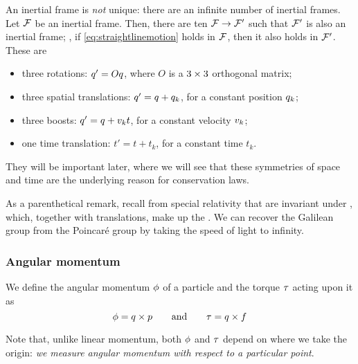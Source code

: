 An inertial frame is \emph{not} unique: there are an infinite number of inertial frames. Let $\mathcal{F}$ be an inertial frame. Then, there are ten  $\mathcal{F}\to\mathcal{F}'$ such that $\mathcal{F}'$ is also an inertial frame; \ie, if \cref{eq:straightlinemotion} holds in $\mathcal{F}$, then it also holds in $\mathcal{F}'$. These are
%
\begin{itemize}
%
\item three rotations: $q' = Oq$, where $O$ is a $3\times 3$ orthogonal matrix;
%
\item three spatial translations: $q' = q + q_k$, for a constant position $q_k$;
%
\item three boosts: $q' = q + v_k t$, for a constant velocity $v_k$;
%
\item one time translation: $t' = t + t_k$, for a constant time $t_k$.
%
\end{itemize}
%
%
%
They will be important later, where we will see that these symmetries of space and time are the underlying reason for conservation laws. 

As a parenthetical remark, recall from special relativity that  are invariant under , which, together with translations, make up the . We can recover the Galilean group from the Poincaré group by taking the speed of light to infinity.


\subsubsection{Angular momentum}
%
We define the angular momentum $\phi$ of a particle and the torque $\tau$ acting upon it as
%
\begin{equation}\label{eq:amomandtork}
  \phi = q\times p 
  \qquad\text{and}\qquad
  \tau = q\times f
\end{equation}

Note that, unlike linear momentum, both $\phi$ and $\tau$ depend on where we take the origin: \emph{we measure angular momentum with respect to a particular point}.



